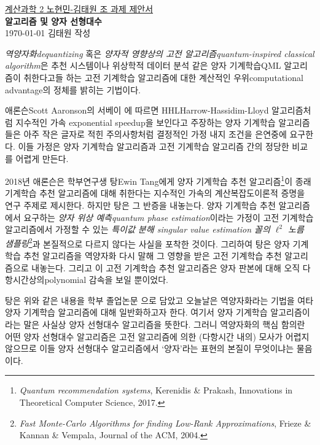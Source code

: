 \documentclass[a4paper,hidelinks]{oblivoir}
\begin{document}
\thispagestyle{empty}
\begin{center}
  \underline{계산과학 2 노현민-김태원 조 과제 제안서} \\
  \textbf{ 알고리즘 및 양자 선형대수} \\ 
  \today\; 김태원 작성
\end{center}
\emph{역양자화\footnotesize dequantizing} 혹은 \emph{양자적 영향상의
고전 알고리즘\footnotesize quantum-inspired classical algorithm}은 추천
시스템이나 위상학적 데이터 분석 같은 양자 기계학습{\footnotesize QML}
알고리즘이 취한다고들 하는 고전 기계학습 알고리즘에 대한 계산적인 
우위{\footnotesize computational advantage}의 정체를 밝히는 기법이다.

애론슨{\footnotesize Scott Aaronson}의 서베이 에 따르면
HHL{\footnotesize Harrow-Hassidim-Lloyd} 알고리즘처럼 지수적인 가속{\footnotesize
exponential speedup}을 보인다고 주장하는 양자 기계학습 알고리즘들은 아주
작은 글자로 적힌 주의사항처럼 결정적인 가정 내지 조건을 은연중에 요구한다.
이들 가정은 양자 기계학습 알고리즘과 고전 기계학습 알고리즘 간의 정당한
비교를 어렵게 만든다.

2018년 애론슨은 학부연구생 탕{\footnotesize Ewin Tang}에게
양자 기계학습 추천 알고리즘\footnote{\emph{Quantum recommendation systems},
  Kerenidis \& Prakash, Innovations in Theoretical Computer Science, 
2017.}이 종래 기계학습 추천 알고리즘에 대해 취한다는 지수적인 가속의
계산복잡도이론적 증명을 연구 주제로 제시한다. 하지만 탕은 그 반증을
내놓는다. 양자 기계학습 추천 알고리즘에서 요구하는 \emph{양자 위상
예측\footnotesize quantum phase estimation}이라는 가정이 고전 기계학습
알고리즘에서 가정할 수 있는 \emph{특이값 분해{\footnotesize
singular value estimation} 꼴의 $\ell^2$ 노름 샘플링}\footnote{\emph{Fast
Monte-Carlo Algorithms for finding Low-Rank Approximations}, Frieze \& Kannan
\& Vempala, Journal of the ACM, 2004.}과 본질적으로 다르지 않다는 사실을 포착한
것이다. 그리하여 탕은 양자 기계학습 추천 알고리즘을 역양자화 다시 말해 그 영향을
받은 고전 기계학습 추천 알고리즘으로 내놓는다. 그리고 이 고전 기계학습 추천
알고리즘은 양자 판본에 대해 오직 다항시간상의{\tiny polynomial} 감속을 보일
뿐이었다.

탕은 위와 같은 내용을 학부 졸업논문 으로 담았고 오늘날은 역양자화라는
기법을 여타 양자 기계학습 알고리즘에 대해 일반화하고자 한다. 여기서 양자 기계학습 
알고리즘이라는 말은 사실상 양자 선형대수 알고리즘을 뜻한다. 그러니 역양자화의
핵심 함의란 어떤 양자 선형대수 알고리즘은 고전 알고리즘에 의한 (다항시간 내의) 
모사가 어렵지 않으므로 이들 양자 선형대수 알고리즘에서 `양자'라는 표현의 본질이
무엇이냐는 물음이다. 
\end{document}
